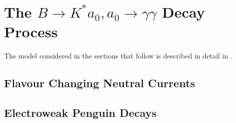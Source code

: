 \section{The $B\rightarrow K^{*}a_{0}, a_{0}\rightarrow\gamma\gamma$ Decay Process} 
The model considered in the sections that follow is described in detail in \cite{Izaguirre2016ANF}.
\subsection{Flavour Changing Neutral Currents} 
\subsection{Electroweak Penguin Decays}


